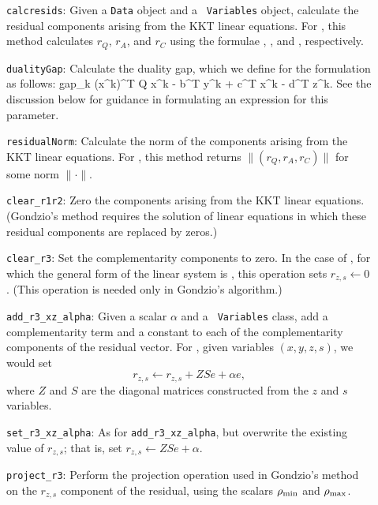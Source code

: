 \begin{description}
\item[] {\tt calcresids}: Given a {\tt Data} object and a {\tt
    Variables} object, calculate the residual components arising from
  the KKT linear equations. For , this method calculates
  $r_Q$, $r_A$, and $r_C$ using the formulae ,
  , and , respectively.
  
\item[] {\tt dualityGap}: Calculate the duality gap, which we define
for the formulation  as follows:
\beq \label{gapk}
\mbox{gap}_k   (x^k)^T  Q x^k - b^T y^k + c^T x^k - d^T z^k.
\eeq
See the discussion below for guidance in formulating an expression for
this parameter.
  
\item[] {\tt residualNorm}: Calculate the norm of the components
  arising from the KKT linear equations. For , this method
  returns $\| (r_Q, r_A, r_C) \|$ for some norm $\| \cdot \|$.
  
\item[] {\tt clear\_r1r2}: Zero the components arising from the KKT
  linear equations. (Gondzio's method requires the solution of linear
  equations in which these residual components are replaced by zeros.)
  
\item[] {\tt clear\_r3}: Set the complementarity components to zero.
  In the case of , for which the general form of the linear
  system is , this operation sets $r_{z,s}
  \leftarrow 0$. (This operation is needed only in Gondzio's
  algorithm.)
 
\item[] {\tt add\_r3\_xz\_alpha}: Given a scalar $\alpha$ and a {\tt
    Variables} class, add a complementarity term and a constant to
  each of the complementarity components of the residual vector. For
  , given variables $(x,y,z,s)$, we would set
\[
r_{z,s} \leftarrow r_{z,s} + Z S e + \alpha e,
\]
where $Z$ and $S$ are the diagonal matrices constructed from the
$z$ and $s$ variables.

\item[] {\tt set\_r3\_xz\_alpha}: As for {\tt add\_r3\_xz\_alpha}, but
  overwrite the existing value of $r_{z,s}$; that is, set $r_{z,s}
  \leftarrow Z S e + \alpha$.
  
\item[] {\tt project\_r3}: Perform the projection operation used in
Gondzio's method on the $r_{z,s}$ component of the residual, using the
scalars $\rho_{\rm min}$ and $\rho_{\rm max}$.

\end{description}


